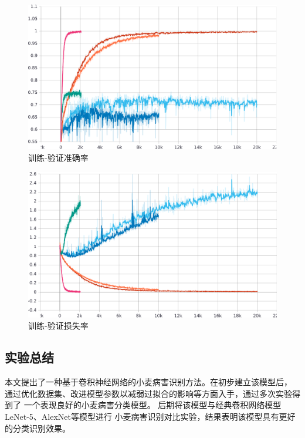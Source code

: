   \begin{figure}[H]
    \centering
    \includegraphics[width=.8\textwidth]{resource/epoch_accuracy.eps}
    \caption{训练-验证准确率}
    \label{Figure.Fourth.2}
  \end{figure}
  \begin{figure}[H]
    \centering
    \includegraphics[width=.8\textwidth]{resource/epoch_loss.eps}
    \caption{训练-验证损失率}
    \label{Figure.Fourth.3}
  \end{figure}

\subsection{\hei\xiaosan\textbf{实验总结}}
  本文提出了一种基于卷积神经网络的小麦病害识别方法。在初步建立该模型后，
  通过优化数据集、改进模型参数以减弱过拟合的影响等方面入手，通过多次实验得到了
  一个表现良好的小麦病害分类模型。
  后期将该模型与经典卷积网络模型LeNet-5、AlexNet等模型进行
  小麦病害识别对比实验，结果表明该模型具有更好的分类识别效果。